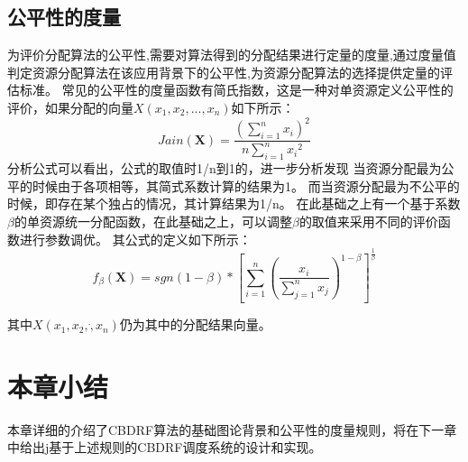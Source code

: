 \subsection{公平性的度量}
为评价分配算法的公平性,需要对算法得到的分配结果进行定量的度量,通过度量值判定资源分配算法在该应用背景下的公平性,为资源分配算法的选择提供定量的评估标准。
常见的公平性的度量函数有简氏指数，这是一种对单资源定义公平性的评价，如果分配的向量$X({x}_{1},{x}_{2},...,{x}_{n})$如下所示：
\begin{equation}
Jain(\textbf{X}) = \frac{{(\sum_{i=1}^{n}{x}_{i})}^{2}}{n\sum_{i=1}^{n}{{x}_{i}}^{2}}
\end{equation}
分析公式可以看出，公式的取值时1/n到1的，进一步分析发现
当资源分配最为公平的时候由于各项相等，其简式系数计算的结果为1。
而当资源分配最为不公平的时候，即存在某个独占的情况，其计算结果为1/n。
在此基础之上有一个基于系数$\beta$的单资源统一分配函数，在此基础之上，可以调整$\beta$的取值来采用不同的评价函数进行参数调优。
其公式的定义如下所示：
\begin{equation}
{f}_{\beta} (\textbf{X})= sgn(1-\beta)*{\left[\sum_{i=1}^{n}{\left(\frac{{x}_{i}}{\sum_{j=1}^{n}{x}_{j}} \right)}^{1 - \beta} \right]}^{\frac{1}{\beta}}
\end{equation}

其中$X({x}_{1},{x}_{2},\dot,{x}_{n})$仍为其中的分配结果向量。


\section{本章小结}
 本章详细的介绍了CBDRF算法的基础图论背景和公平性的度量规则，将在下一章中给出j基于上述规则的CBDRF调度系统的设计和实现。
